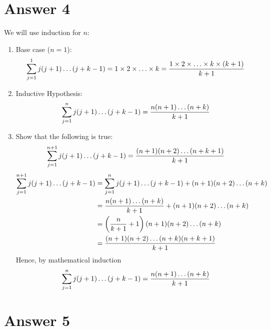 \documentclass[12pt]{article}
\begin{document}
\newpage

\section*{Answer 4}

We will use induction for $n$:
\begin{enumerate}
	\item Base case ($n=1$): \[\sum_{j=1}^1j(j+1)\mathellipsis(j+k-1) = 1 \times 2 \times \mathellipsis \times k = \frac{1 \times 2 \times \mathellipsis \times k \times (k+1)}{k+1}\]
	\item Inductive Hypothesis:\[\sum_{j=1}^nj(j+1)\mathellipsis(j+k-1) = \frac{n (n+1) \mathellipsis (n+k)}{k+1}\]
	\item Show that the following is true:\[\sum_{j=1}^{n+1}j(j+1)\mathellipsis(j+k-1) = \frac{(n+1)(n+2) \mathellipsis (n+k+1)}{k+1}\] 
	\begin{align*}
		\sum_{j=1}^{n+1}j(j+1)\mathellipsis(j+k-1) &= \sum_{j=1}^{n}j(j+1)\mathellipsis(j+k-1)+ (n+1)(n+2)\mathellipsis(n+k)\\
		&= \frac{n(n+1)\mathellipsis(n+k)}{k+1} + (n+1)(n+2)\mathellipsis(n+k)\\
		&= \left(\frac{n}{k+1} + 1\right)(n+1)(n+2)\mathellipsis(n+k)\\
		&= \frac{(n+1)(n+2)\mathellipsis(n+k)(n+k+1)}{k+1}\\
	\end{align*}
	Hence, by mathematical induction \[\sum_{j=1}^nj(j+1)\mathellipsis(j+k-1) = \frac{n (n+1) \mathellipsis (n+k)}{k+1}\]

	
\end{enumerate}

\newpage
\section*{Answer 5}
\end{document}
